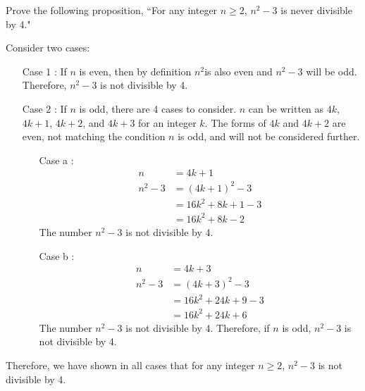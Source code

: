 \documentclass[12pt,addpoints]{exam}
\begin{document}
\begin{questions}
\question Prove the following proposition, ``For any integer $n \geq 2$, $n^2-3$ is never divisible by 4."
    \ifprintanswers
        \vspace{-10pt}
    \fi
\begin{solution}
    Consider two cases:
    \begin{itemize}
        \item[Case 1]: If $n$ is even, then by definition $n^2$is also even and $n^2-3$ will be odd.  Therefore, $n^2-3$ is not divisible by 4.
        \item[Case 2]: If $n$ is odd, there are 4 cases to consider. $n$ can be written as $4k$, $4k+1$, $4k+2$, and $4k+3$ for an integer $k$.  The forms of $4k$ and $4k+2$ are even, not matching the condition $n$ is odd, and will not be considered further.
            \begin{itemize}
                \item[Case a]:
                \begin{align*}
                    n &= 4k + 1 \\
                    n^2 - 3 &= (4k + 1)^2 - 3 \\
                        &= 16k^2 + 8k + 1 - 3 \\
                        &= 16k^2 +8k - 2
                \end{align*}
                The number $n^2-3$ is not divisible by 4.
                \item[Case b]:
                \begin{align*}
                    n &= 4k+3 \\
                    n^2 - 3 &= (4k + 3)^2 - 3 \\
                     &= 16k^2 + 24k + 9 - 3 \\
                     &= 16k^2 + 24k + 6
                \end{align*}
                The number $n^2-3$ is not divisible by 4.
                Therefore, if $n$ is odd, $n^2-3$ is not divisible by 4.
            \end{itemize}
        \end{itemize}
        Therefore, we have shown in all cases that for any integer $n \geq 2$, $n^2 - 3$ is not divisible by 4.
\end{solution}



\end{questions}
\end{document}
